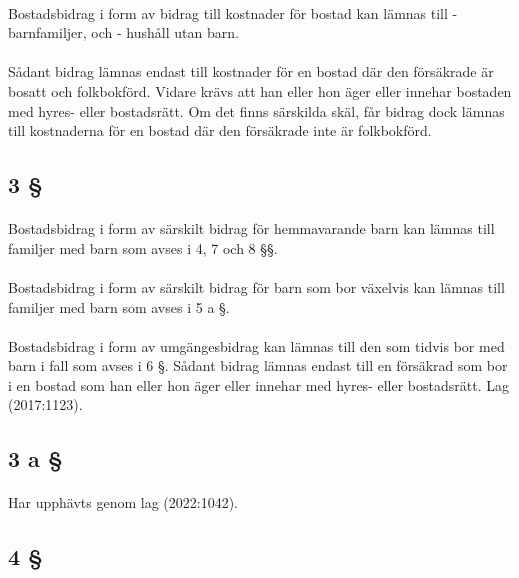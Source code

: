 \documentclass[a4paper,notitlepage,openany,10pt]{book}
\begin{document}
\paragraph*{}
Bostadsbidrag i form av bidrag till kostnader för bostad kan lämnas till
\newline - barnfamiljer, och
\newline - hushåll utan barn.
\paragraph*{}
Sådant bidrag lämnas endast till kostnader för en bostad där den försäkrade är bosatt och folkbokförd. Vidare krävs att han eller hon äger eller innehar bostaden med hyres- eller bostadsrätt. Om det finns särskilda skäl, får bidrag dock lämnas till kostnaderna för en bostad där den försäkrade inte är folkbokförd.
\subsection*{3 §}
\paragraph*{}
Bostadsbidrag i form av särskilt bidrag för hemmavarande barn kan lämnas till familjer med barn som avses i 4, 7 och 8 §§.
\paragraph*{}
Bostadsbidrag i form av särskilt bidrag för barn som bor växelvis kan lämnas till familjer med barn som avses i 5 a §.
\paragraph*{}
Bostadsbidrag i form av umgängesbidrag kan lämnas till den som tidvis bor med barn i fall som avses i 6 §. Sådant bidrag lämnas endast till en försäkrad som bor i en bostad som han eller hon äger eller innehar med hyres- eller bostadsrätt.
Lag (2017:1123).
\subsection*{3 a §}
\paragraph*{}
Har upphävts genom
lag (2022:1042).
\subsection*{4 §}
\end{document}
